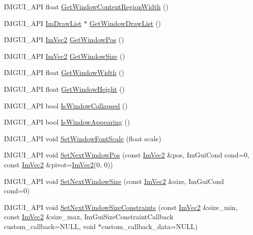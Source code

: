 \begin{DoxyCompactItemize}
I\+M\+G\+U\+I\+\_\+\+A\+PI float \hyperlink{namespace_im_gui_a87c1de99e670bff87c43bfb07bbf898f}{Get\+Window\+Content\+Region\+Width} ()
\item 
I\+M\+G\+U\+I\+\_\+\+A\+PI \hyperlink{struct_im_draw_list}{Im\+Draw\+List} $\ast$ \hyperlink{namespace_im_gui_aa100c22a9feafe843fa12c66590cbda0}{Get\+Window\+Draw\+List} ()
\item 
I\+M\+G\+U\+I\+\_\+\+A\+PI \hyperlink{struct_im_vec2}{Im\+Vec2} \hyperlink{namespace_im_gui_a413d939f3ef416a47d6e5b48be955146}{Get\+Window\+Pos} ()
\item 
I\+M\+G\+U\+I\+\_\+\+A\+PI \hyperlink{struct_im_vec2}{Im\+Vec2} \hyperlink{namespace_im_gui_aaa5c0bfac7125ba9850a08b6db2e90c9}{Get\+Window\+Size} ()
\item 
I\+M\+G\+U\+I\+\_\+\+A\+PI float \hyperlink{namespace_im_gui_a471ff23945b99541c506dbdc2a9004cf}{Get\+Window\+Width} ()
\item 
I\+M\+G\+U\+I\+\_\+\+A\+PI float \hyperlink{namespace_im_gui_a44d2bfb80e0d2dd232a553ab29a91b52}{Get\+Window\+Height} ()
\item 
I\+M\+G\+U\+I\+\_\+\+A\+PI bool \hyperlink{namespace_im_gui_a2a6492aea9013c0078fc530a66e11768}{Is\+Window\+Collapsed} ()
\item 
I\+M\+G\+U\+I\+\_\+\+A\+PI bool \hyperlink{namespace_im_gui_a99fd14154aae264087d471132e56a42e}{Is\+Window\+Appearing} ()
\item 
I\+M\+G\+U\+I\+\_\+\+A\+PI void \hyperlink{namespace_im_gui_a11f2f343dbc9b00ccd9e99ebd59cfe8b}{Set\+Window\+Font\+Scale} (float scale)
\item 
I\+M\+G\+U\+I\+\_\+\+A\+PI void \hyperlink{namespace_im_gui_afbccd31113430670b5ab2bf0d6f509bf}{Set\+Next\+Window\+Pos} (const \hyperlink{struct_im_vec2}{Im\+Vec2} \&pos, Im\+Gui\+Cond cond=0, const \hyperlink{struct_im_vec2}{Im\+Vec2} \&pivot=\hyperlink{struct_im_vec2}{Im\+Vec2}(0, 0))
\item 
I\+M\+G\+U\+I\+\_\+\+A\+PI void \hyperlink{namespace_im_gui_ab33717bb71ef5e393ae18656fc6b229d}{Set\+Next\+Window\+Size} (const \hyperlink{struct_im_vec2}{Im\+Vec2} \&size, Im\+Gui\+Cond cond=0)
\item 
I\+M\+G\+U\+I\+\_\+\+A\+PI void \hyperlink{namespace_im_gui_a06f40aaf9cf2539c8dba43156a131e45}{Set\+Next\+Window\+Size\+Constraints} (const \hyperlink{struct_im_vec2}{Im\+Vec2} \&size\+\_\+min, const \hyperlink{struct_im_vec2}{Im\+Vec2} \&size\+\_\+max, Im\+Gui\+Size\+Constraint\+Callback custom\+\_\+callback=N\+U\+LL, void $\ast$custom\+\_\+callback\+\_\+data=N\+U\+LL)
\item 

\end{DoxyCompactItemize}
